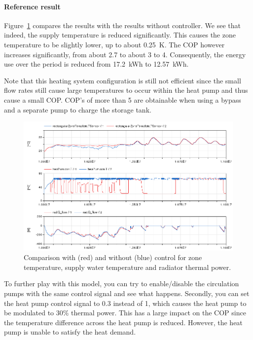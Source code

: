\documentclass[10pt,a4paper]{article}
\begin{document}
\paragraph{Reference result}
Figure~\ref{fig:res2} compares the results with the results without controller.
We see that indeed, the supply temperature is reduced significantly.
This causes the zone temperature to be slightly lower, up to about 0.25~K.
The COP however increases significantly, from about 2.7 to about 3 to 4.
Consequently, the energy use over the period is reduced from 17.2~kWh
to 12.57~kWh.

Note that this heating system configuration is still 
not efficient since the small flow rates still cause 
large temperatures to occur within the heat pump
and thus cause a small COP.
COP's of more than 5 are obtainable when using a bypass and a separate
pump to charge the storage tank.\\


\begin{figure}
\centering
\includegraphics[width=\linewidth]{Example7.png}
\caption{Comparison with (red) and without (blue) control for zone temperature, supply water temperature and radiator thermal power.}
\label{fig:res2}
\end{figure}


To further play with this model, you can try to enable/disable the circulation pumps with the same control
signal and see what happens.
Secondly, you can set the heat pump control signal to 0.3 instead of 1,
which causes the heat pump to be modulated to 30\% thermal power.
This has a large impact on the COP since the temperature difference across the heat 
pump is reduced. 
However, the heat pump is unable to satisfy the heat demand.
\end{document}
